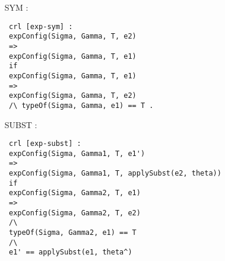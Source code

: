 \documentclass{article}
\begin{document}
\begin{itemize}
\item[SYM]: \begin{lstlisting}
 crl [exp-sym] :
 expConfig(Sigma, Gamma, T, e2)
 =>
 expConfig(Sigma, Gamma, T, e1)
 if 
 expConfig(Sigma, Gamma, T, e1)
 =>
 expConfig(Sigma, Gamma, T, e2)
 /\ typeOf(Sigma, Gamma, e1) == T .  
\end{lstlisting}

\item[SUBST] :
\begin{lstlisting}
 crl [exp-subst] :
 expConfig(Sigma, Gamma1, T, e1')
 => 
 expConfig(Sigma, Gamma1, T, applySubst(e2, theta))
 if 
 expConfig(Sigma, Gamma2, T, e1)
 => 
 expConfig(Sigma, Gamma2, T, e2)
 /\ 
 typeOf(Sigma, Gamma2, e1) == T
 /\
 e1' == applySubst(e1, theta^)
\end{lstlisting}


\end{itemize}
\end{document}
